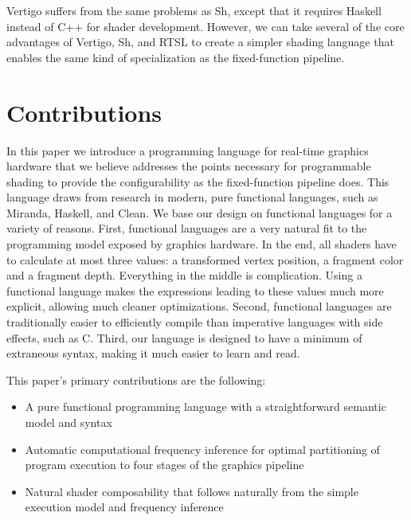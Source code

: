 \documentclass[review]{acmsiggraph}      %
\begin{document}
Vertigo suffers from the same problems as Sh, except that it requires
Haskell instead of C++ for shader development.  However, we can take
several of the core advantages of Vertigo, Sh, and RTSL to create a
simpler shading language that enables the same kind of specialization
as the fixed-function pipeline.


\section{Contributions}


In this paper we introduce a programming language for real-time graphics
hardware that we believe addresses the points necessary for programmable
shading to provide the configurability as the fixed-function pipeline does. 
This language draws from research in modern, pure functional languages, such
as Miranda, Haskell, and Clean.  We base our design on functional languages
for a variety of reasons.  First, functional languages are a very natural
fit to the programming model exposed by graphics hardware.  In the end, all
shaders have to calculate at most three values: a transformed vertex
position, a fragment color and a fragment depth. Everything in the middle is
complication. Using a functional language makes the expressions leading to
these values much more explicit, allowing much cleaner optimizations.
Second, functional languages are traditionally easier to efficiently compile
than imperative languages with side effects, such as C.  Third, our language
is designed to have a minimum of extraneous syntax, making it much easier to
learn and read.

This paper's primary contributions are the following:

\begin{itemize}

\item{A pure functional programming language with a straightforward
  semantic model and syntax}

\item{Automatic computational frequency inference for optimal partitioning
  of program execution to four stages of the graphics pipeline}

\item{Natural shader composability that follows naturally from the simple
  execution model and frequency inference}

\end{itemize}
\end{document}
